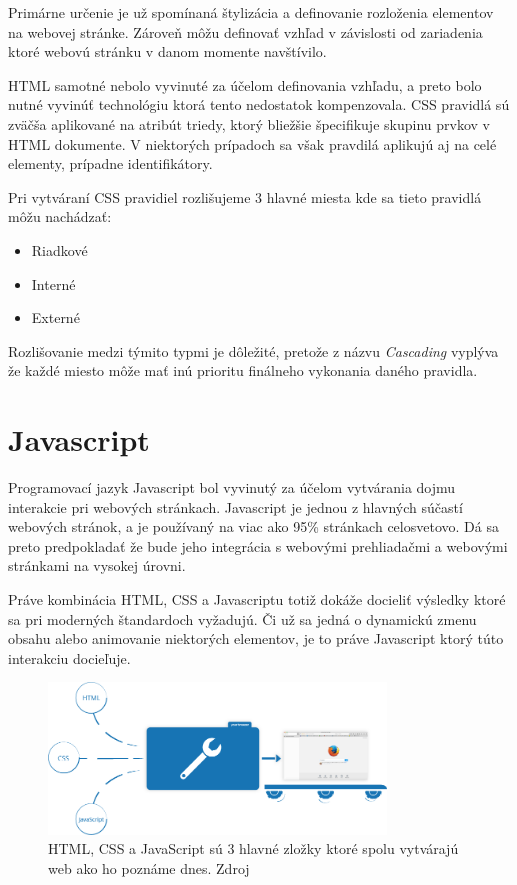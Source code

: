 Primárne určenie je už spomínaná štylizácia a definovanie rozloženia elementov na webovej stránke. Zároveň môžu definovať vzhľad v závislosti od zariadenia ktoré webovú stránku v danom momente navštívilo. 

HTML samotné nebolo vyvinuté za účelom definovania vzhľadu, a preto bolo nutné vyvinúť technológiu ktorá tento nedostatok kompenzovala. CSS pravidlá sú zväčša aplikované na atribút triedy, ktorý bliežšie špecifikuje skupinu prvkov v HTML dokumente. V niektorých prípadoch sa však pravdilá aplikujú aj na celé elementy, prípadne identifikátory.\cite{CSSIntro}

Pri vytváraní CSS pravidiel rozlišujeme 3 hlavné miesta kde sa tieto pravidlá môžu nachádzať:

\begin{itemize}
    \item {Riadkové}
    \item {Interné}
    \item {Externé}
\end{itemize}

Rozlišovanie medzi týmito typmi je dôležité, pretože z názvu \textit{Cascading} vyplýva že každé miesto môže mať inú prioritu finálneho vykonania daného pravidla.

\section{Javascript}

Programovací jazyk Javascript bol vyvinutý za účelom vytvárania dojmu interakcie pri webových stránkach. Javascript je jednou z hlavných súčastí webových stránok, a je používaný na viac ako 95\% stránkach celosvetovo.\cite{HowPopular} Dá sa preto predpokladať že bude jeho integrácia s webovými prehliadačmi a webovými stránkami na vysokej úrovni. 

\bigskip

Práve kombinácia HTML, CSS a Javascriptu totiž dokáže docieliť výsledky ktoré sa pri moderných štandardoch vyžadujú. Či už sa jedná o dynamickú zmenu obsahu alebo animovanie niektorých elementov, je to práve Javascript ktorý túto interakciu docieľuje. \cite{Javascript}
\newpage
\begin{figure}[hbt]
	\centering
	\includegraphics[width=0.8\textwidth]{obrazky-figures/jsexecution.png}
	\caption{HTML, CSS a JavaScript sú 3 hlavné zložky ktoré spolu vytvárajú web ako ho poznáme dnes. Zdroj \cite{Javascript}}
	\label{Jsexecution_img}
\end{figure}

